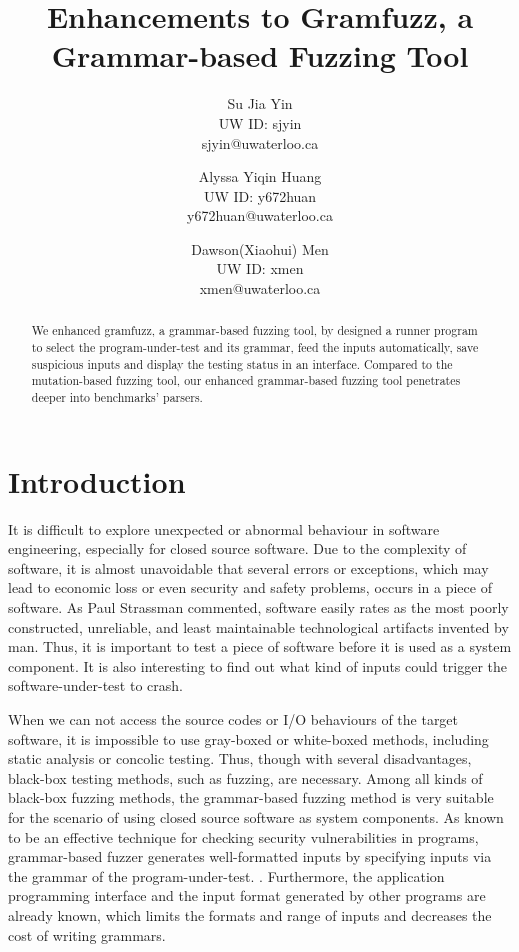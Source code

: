\documentclass[11pt,a4paper]{article}
\author{
    Su Jia Yin\\
    UW ID: sjyin\\
    sjyin@uwaterloo.ca
    \and
    Alyssa Yiqin Huang\\
    UW ID: y672huan\\
    y672huan@uwaterloo.ca
    \and
    Dawson(Xiaohui) Men\\
    UW ID: xmen\\
    xmen@uwaterloo.ca
}
\title{Enhancements to Gramfuzz, a Grammar-based Fuzzing Tool}
\begin{document}
\setlength{\parskip}{1em} 
\setlength{\parindent}{2em}
\maketitle

\begin{abstract}
    We enhanced {\cc gramfuzz}, a grammar-based fuzzing tool, by designed a runner program to select the program-under-test and its grammar, feed the inputs automatically, save suspicious inputs and display the testing status in an interface. Compared to the mutation-based fuzzing tool, our enhanced grammar-based fuzzing tool penetrates deeper into benchmarks' parsers. 
\end{abstract}

\section{Introduction}
It is difficult to explore unexpected or abnormal behaviour in software engineering, especially for closed source software.\cite{fuzzingbook2020}  Due to the complexity of software, it is almost unavoidable that several errors or exceptions, which may lead to economic loss or even security and safety problems, occurs in a piece of software. As Paul Strassman commented, software easily rates as the most poorly constructed, unreliable, and least maintainable technological artifacts invented by man. Thus, it is important to test a piece of software before it is used as a system component. It is also interesting to find out what kind of inputs could trigger the software-under-test to crash.

When we can not access the source codes or I/O behaviours of the target software, it is impossible to use gray-boxed or white-boxed methods, including static analysis or concolic testing. Thus, though with several disadvantages, black-box testing methods, such as fuzzing, are necessary. Among all kinds of black-box fuzzing methods, the grammar-based fuzzing method is very suitable for the scenario of using closed source software as system components. As known to be an effective technique for checking security vulnerabilities in programs, grammar-based fuzzer generates well-formatted inputs by specifying inputs via the grammar of the program-under-test. \cite{8636353,7958599}. Furthermore, the application programming interface and the input format generated by other programs are already known, which limits the formats and range of inputs and decreases the cost of writing grammars.
\end{document}
